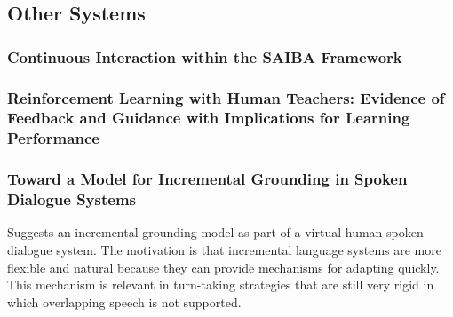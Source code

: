 \subsection*{Other Systems}


\subsubsection*{Continuous Interaction within the SAIBA Framework}



\subsubsection*{Reinforcement Learning with Human Teachers: Evidence of Feedback and Guidance with Implications for Learning Performance}






\subsubsection*{Toward a Model for Incremental Grounding in Spoken Dialogue Systems}

Suggests an incremental grounding model as part of a virtual human spoken dialogue system. The motivation is that incremental language systems are more flexible and natural because they can provide mechanisms for adapting quickly. This mechanism is relevant in turn-taking strategies that are still very rigid in which overlapping speech is not supported. 

